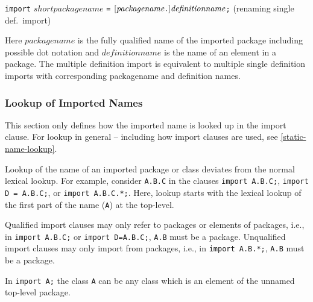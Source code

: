 \lstinline!import! $\mathit{shortpackagename}$ \lstinline!=! ${[}\mathit{packagename}\text{\lstinline!.!}{]}\mathit{definitionname}$\lstinline!;! (renaming single def.\ import)

Here $\mathit{packagename}$ is the fully qualified name of the imported
package including possible dot notation and $\mathit{definitionname}$ is the
name of an element in a package. The multiple definition import is
equivalent to multiple single definition imports with corresponding
packagename and definition names.

\subsubsection{Lookup of Imported Names}

This section only defines how the imported name is looked up in the
import clause. For lookup in general -- including how import clauses are
used, see \autoref{static-name-lookup}.

Lookup of the name of an imported package or class deviates from the normal lexical lookup.  For example, consider \lstinline!A.B.C! in the clauses \lstinline!import A.B.C;!, \lstinline!import D = A.B.C;!, or \lstinline!import A.B.C.*;!.
Here, lookup starts with the lexical lookup of the first part of the name (\lstinline!A!) at the top-level.

Qualified import clauses may only refer to packages or elements of
packages, i.e., in \lstinline!import A.B.C;! or \lstinline!import D=A.B.C;!,
\lstinline!A.B! must be a
package. Unqualified import clauses may only import from packages, i.e.,
in \lstinline!import A.B.*;!, \lstinline!A.B! must be a package.

\begin{nonnormative}
In \lstinline!import A;! the class \lstinline!A! can be any class which is an element of the unnamed top-level package.
\end{nonnormative}

